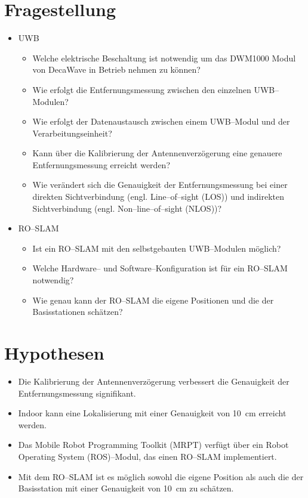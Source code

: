 \documentclass[12pt]{article}
\begin{document}
\section{Fragestellung}
\begin{itemize}
	\item UWB
	\begin{itemize}
		\item Welche elektrische Beschaltung ist notwendig um das DWM1000 Modul von DecaWave in Betrieb nehmen zu können?
		\item Wie erfolgt die Entfernungsmessung zwischen den einzelnen UWB--Modulen?
		\item Wie erfolgt der Datenaustausch zwischen einem UWB--Modul und der Verarbeitungseinheit?
		\item Kann über die Kalibrierung der Antennenverzögerung eine genauere Entfernungsmessung erreicht werden?
		\item Wie verändert sich die Genauigkeit der Entfernungsmessung bei einer direkten Sichtverbindung (engl. Line--of--sight (LOS)) und indirekten Sichtverbindung (engl. Non--line--of--sight (NLOS))?
	\end{itemize}
	\item RO--SLAM
	\begin{itemize}
		\item Ist ein RO--SLAM mit den selbstgebauten UWB--Modulen möglich?
		\item Welche Hardware-- und Software--Konfiguration ist für ein RO--SLAM notwendig?
		\item Wie genau kann der RO--SLAM die eigene Positionen und die der Basisstationen schätzen?
	\end{itemize}
\end{itemize}


%
%
\section{Hypothesen}
\begin{itemize}
	\item Die Kalibrierung der Antennenverzögerung verbessert die Genauigkeit der Entfernungsmessung signifikant.
	\item Indoor kann eine Lokalisierung mit einer Genauigkeit von \SI{10}{\cm} erreicht werden.
	\item Das Mobile Robot Programming Toolkit (MRPT) verfügt über ein Robot Operating System (ROS)--Modul, das einen RO--SLAM implementiert.
	\item Mit dem RO--SLAM ist es möglich sowohl die eigene Position als auch die der Basisstation mit einer Genauigkeit von \SI{10}{\cm} zu schätzen.
\end{itemize}
\end{document}
